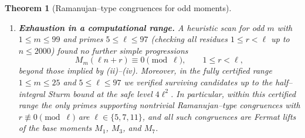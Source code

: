 \documentclass[11pt]{article}
\newtheorem{theorem}{Theorem}[section]
\theoremstyle{definition}
\theoremstyle{remark}
\begin{document}
\begin{theorem}[Ramanujan--type congruences for odd moments]
\begin{enumerate}
\item[\textup{(v)}] \textbf{Exhaustion in a computational range.}
A heuristic scan for odd $m$ with $1\le m\le99$ and primes $5\le\ell\le97$
(checking all residues $1\le r<\ell$ up to $n\le2000$) found no further simple
progressions
\[
M_m(\ell n+r)\equiv0\pmod{\ell},\qquad 1\le r<\ell,
\]
beyond those implied by \textup{(ii)}–\textup{(iv)}.
Moreover, in the fully certified range $1\le m\le25$ and $5\le\ell\le97$ we
verified surviving candidates up to the half--integral Sturm bound at the safe
level $4\ell^2$.  In particular, within this certified range the only primes
supporting nontrivial Ramanujan--type congruences with $r\not\equiv0\pmod{\ell}$
are $\ell\in\{5,7,11\}$, and all such congruences are Fermat lifts of the base
moments $M_1$, $M_3$, and $M_7$.

\end{enumerate}
\end{theorem}
\end{document}
